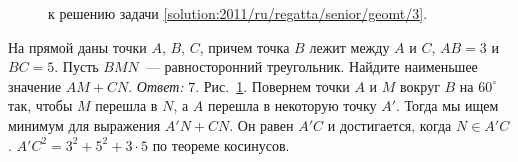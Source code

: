 \ifsolution
\begin{figure}\centering
    \caption{к решению задачи \ref{solution:2011/ru/regatta/senior/geomt/3}.}
    \label{fig:solution:2011/ru/regatta/senior/geomt/3}
\end{figure}
\fi %

\problem
На прямой даны точки $A$, $B$, $C$, причем точка $B$ лежит между $A$ и $C$, $AB = 3$ и $BC = 5$.
Пусть $BMN$~--- равносторонний треугольник.
Найдите наименьшее значение $AM + CN$.
\solution
\label{solution:2011/ru/regatta/senior/geomt/3}%
\emph{Ответ:} $7$.
Рис.~\ref{fig:solution:2011/ru/regatta/senior/geomt/3}.
Повернем точки $A$ и $M$ вокруг $B$ на $60^\circ$ так, чтобы $M$ перешла в $N$,
а $A$ перешла в некоторую точку $A'$.
Тогда мы ищем минимум для выражения $A'N + CN$.
Он равен $A'C$ и достигается, когда $N \in A'C$.
$A'C^2 = 3^2 + 5^2 + 3 \cdot 5$ по теореме косинусов.
\endproblem
